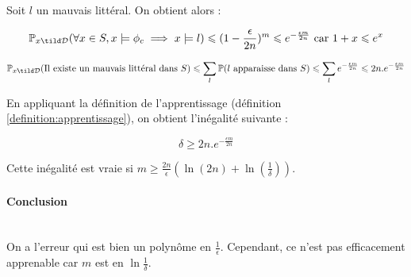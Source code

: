 \documentclass{article}
\begin{document}
Soit $l$ un mauvais littéral. On obtient alors :

\begin{equation*}
  \mathbb{P}_{x \tild \mathcal{D}}(\forall x \in S, x \models \phi_c \implies x \models l) \leqslant (1 - \frac{\epsilon}{2n})^m \leqslant e^{-\frac{\epsilon m}{2n}} \text{ car $1+x \leqslant e^x$}
\end{equation*}

\begin{equation*}
  \mathbb{P}_{x \tild \mathcal{D}}(\text{Il existe un mauvais littéral dans $S$}) \leqslant \sum_{l} \mathbb{P}(l \text{ apparaisse dans $S$}) \leqslant  \sum_{l} e^{-\frac{\epsilon m}{2n}} \leqslant 2n.e^{-\frac{\epsilon m}{2n}}
\end{equation*}

En appliquant la définition de l'apprentissage (définition \ref{definition:apprentissage}), on obtient l'inégalité suivante :

\begin{equation*}
  \delta \geqslant 2n.e^{-\frac{\epsilon m}{2n}}
\end{equation*}

Cette inégalité est vraie si $\boxed{m \geqslant \frac{2n}{\epsilon} (\ln (2n) + \ln(\frac{1}{\delta}))}$.

\paragraph{Conclusion}~\\
On a l'erreur qui est bien un polynôme en $\frac{1}{\epsilon}$. Cependant, ce n'est pas efficacement apprenable car $m$ est en $\ln \frac{1}{\delta}$.
\end{document}
